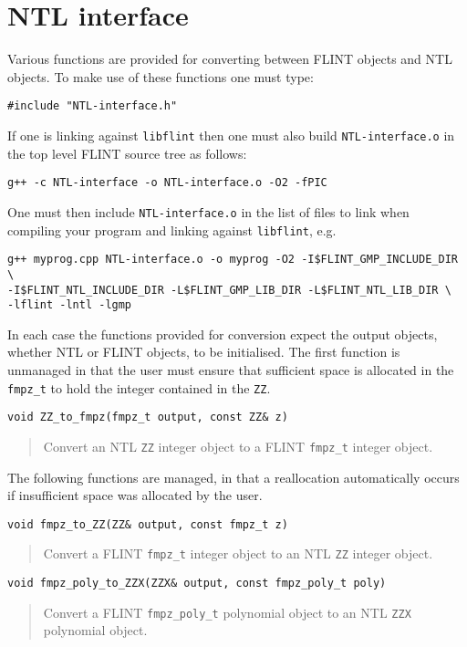 \documentclass[a4paper,10pt]{article}
\newcommand{\code}{\lstinline}
\begin{document}
\section{NTL interface}
Various functions are provided for converting between FLINT objects and NTL objects. To make use of these functions one must type:

\code{#include "NTL-interface.h"}

If one is linking against \code{libflint} then one must also build \code{NTL-interface.o} in the top level FLINT source tree as follows:
\begin{lstlisting}
g++ -c NTL-interface -o NTL-interface.o -O2 -fPIC
\end{lstlisting}

One must then include \code{NTL-interface.o} in the list of files to link when compiling your program and linking against \code{libflint}, e.g.

\begin{lstlisting}
g++ myprog.cpp NTL-interface.o -o myprog -O2 -I$FLINT_GMP_INCLUDE_DIR \
-I$FLINT_NTL_INCLUDE_DIR -L$FLINT_GMP_LIB_DIR -L$FLINT_NTL_LIB_DIR \
-lflint -lntl -lgmp
\end{lstlisting}

In each case the functions provided for conversion expect the output objects, whether NTL or FLINT objects, to be initialised. The first function is unmanaged in that the 
user must ensure that sufficient space is allocated in the \code{fmpz_t} to hold the integer contained in the \code{ZZ}.

\begin{lstlisting}
void ZZ_to_fmpz(fmpz_t output, const ZZ& z)
\end{lstlisting}
\begin{quote}
Convert an NTL \code{ZZ} integer object to a FLINT \code{fmpz_t} integer object.
\end{quote}

The following functions are managed, in that a reallocation automatically occurs if insufficient space was allocated by the user.

\begin{lstlisting}
void fmpz_to_ZZ(ZZ& output, const fmpz_t z)
\end{lstlisting}
\begin{quote}
Convert a FLINT \code{fmpz_t} integer object to an NTL \code{ZZ} integer object.
\end{quote}

\begin{lstlisting}
void fmpz_poly_to_ZZX(ZZX& output, const fmpz_poly_t poly)
\end{lstlisting}
\begin{quote}
Convert a FLINT \code{fmpz_poly_t} polynomial object to an NTL \code{ZZX} polynomial object.
\end{quote}
\end{document}
